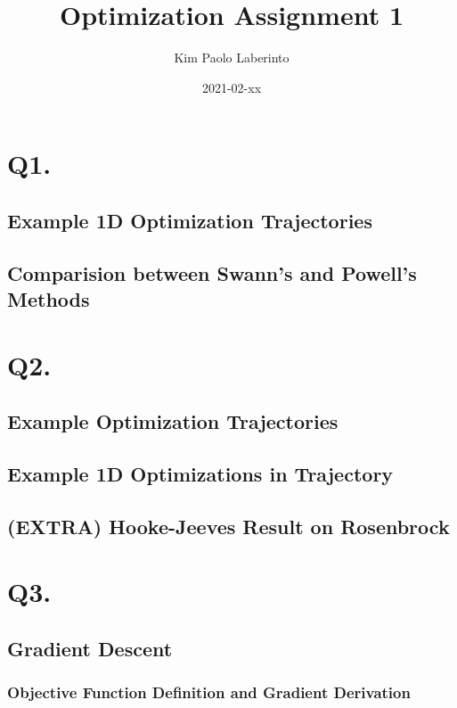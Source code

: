\documentclass{article}
\title{Optimization Assignment 1}
\date{2021-02-xx}
\author{Kim Paolo Laberinto}
\begin{document}
    \maketitle
    \newpage

    \tableofcontents
    \newpage

    \section{Q1.}

    \subsection{Example 1D Optimization Trajectories}


    \subsection{Comparision between Swann's and Powell's Methods}

    \section{Q2.}

    \subsection{Example Optimization Trajectories}

    \subsection{Example 1D Optimizations in Trajectory}

    \subsection{(EXTRA) Hooke-Jeeves Result on Rosenbrock}

    \section{Q3.}

    \subsection{Gradient Descent}

    \subsubsection{Objective Function Definition and Gradient Derivation}
\end{document}

